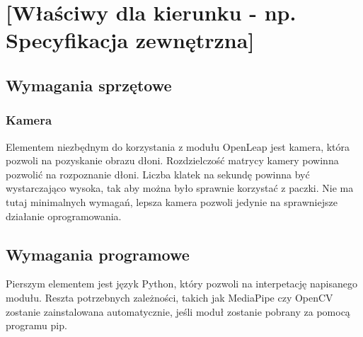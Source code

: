 

\chapter{[Właściwy dla kierunku - np. Specyfikacja zewnętrzna]}

\section{Wymagania sprzętowe}
\subsection{Kamera}
\quad Elementem niezbędnym do korzystania z modułu OpenLeap jest kamera, która pozwoli na pozyskanie obrazu dłoni. Rozdzielczość matrycy kamery powinna pozwolić na rozpoznanie dłoni. Liczba klatek na sekundę powinna być wystarczająco wysoka, tak aby można było sprawnie korzystać z paczki. Nie ma tutaj minimalnych wymagań, lepsza kamera pozwoli jedynie na sprawniejsze działanie oprogramowania. 

\section{Wymagania programowe}
\quad Pierszym elementem jest język Python, który pozwoli na interpetację napisanego modułu. Reszta potrzebnych zależności, takich jak MediaPipe czy OpenCV zostanie zainstalowana automatycznie, jeśli moduł zostanie pobrany za pomocą programu pip. 

